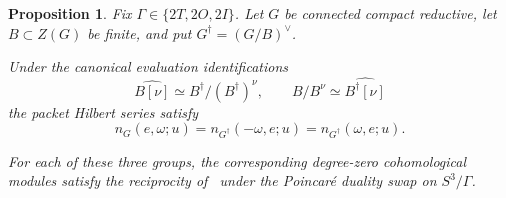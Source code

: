 \documentclass[11pt,a4paper,reqno]{amsart}
\theoremstyle{plain}
\newtheorem{proposition}[theorem]{Proposition}
\theoremstyle{definition}
\theoremstyle{remark}
\numberwithin{equation}{section}
\begin{document}
\begin{proposition}\label{prop:packet-reciprocity}
Fix $\Gamma\in\{2T,2O,2I\}$. Let $G$ be connected compact reductive, let $B\subset Z(G)$ be finite, and put $G^\dagger=(G/B)^\vee$.

Under the canonical evaluation identifications
\[
\widehat{B[\nu]}\simeq B^\dagger/(B^\dagger)^\nu,\qquad B/B^\nu\simeq\widehat{B^\dagger[\nu]}
\]
the packet Hilbert series satisfy
\begin{equation}\label{eq:hilbert-reciprocity}
n_G(e,\omega;u)=n_{G^\dagger}(-\omega,e;u)=n_{G^\dagger}(\omega,e;u).
\end{equation}

For each of these three groups, the corresponding degree-zero cohomological modules satisfy the reciprocity of~\cite[Conjecture~1.9]{kojima-tachikawa} under the Poincar\'e duality swap on $S^3/\Gamma$.
\end{proposition}
\end{document}
